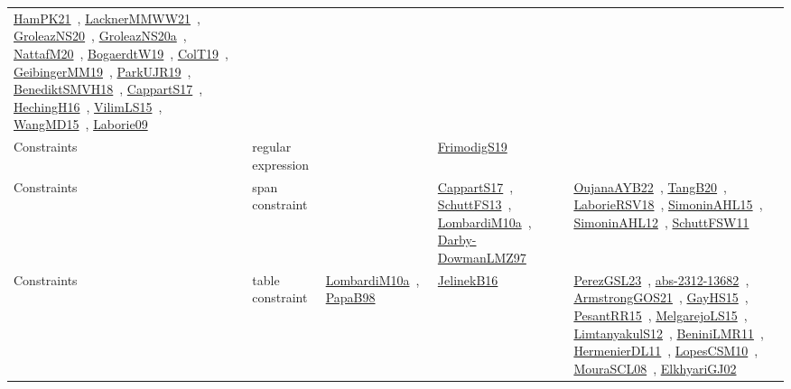 {\begin{longtable}{lp{3cm}>{\raggedright\arraybackslash}p{6cm}>{\raggedright\arraybackslash}p{6cm}>{\raggedright\arraybackslash}p{8cm}}
\href{articles/HamPK21.pdf}{HamPK21}~\cite{HamPK21}, \href{papers/LacknerMMWW21.pdf}{LacknerMMWW21}~\cite{LacknerMMWW21}, \href{papers/GroleazNS20.pdf}{GroleazNS20}~\cite{GroleazNS20}, \href{papers/GroleazNS20a.pdf}{GroleazNS20a}~\cite{GroleazNS20a}, \href{papers/NattafM20.pdf}{NattafM20}~\cite{NattafM20}, \href{papers/BogaerdtW19.pdf}{BogaerdtW19}~\cite{BogaerdtW19}, \href{papers/ColT19.pdf}{ColT19}~\cite{ColT19}, \href{papers/GeibingerMM19.pdf}{GeibingerMM19}~\cite{GeibingerMM19}, \href{papers/ParkUJR19.pdf}{ParkUJR19}~\cite{ParkUJR19}, \href{papers/BenediktSMVH18.pdf}{BenediktSMVH18}~\cite{BenediktSMVH18}, \href{papers/CappartS17.pdf}{CappartS17}~\cite{CappartS17}, \href{papers/HechingH16.pdf}{HechingH16}~\cite{HechingH16}, \href{papers/VilimLS15.pdf}{VilimLS15}~\cite{VilimLS15}, \href{articles/WangMD15.pdf}{WangMD15}~\cite{WangMD15}, \href{papers/Laborie09.pdf}{Laborie09}~\cite{Laborie09}\\
Constraints & regular expression &  & \href{papers/FrimodigS19.pdf}{FrimodigS19}~\cite{FrimodigS19} & \\
Constraints & span constraint &  & \href{papers/CappartS17.pdf}{CappartS17}~\cite{CappartS17}, \href{papers/SchuttFS13.pdf}{SchuttFS13}~\cite{SchuttFS13}, \href{articles/LombardiM10a.pdf}{LombardiM10a}~\cite{LombardiM10a}, \href{articles/Darby-DowmanLMZ97.pdf}{Darby-DowmanLMZ97}~\cite{Darby-DowmanLMZ97} & \href{papers/OujanaAYB22.pdf}{OujanaAYB22}~\cite{OujanaAYB22}, \href{papers/TangB20.pdf}{TangB20}~\cite{TangB20}, \href{articles/LaborieRSV18.pdf}{LaborieRSV18}~\cite{LaborieRSV18}, \href{articles/SimoninAHL15.pdf}{SimoninAHL15}~\cite{SimoninAHL15}, \href{papers/SimoninAHL12.pdf}{SimoninAHL12}~\cite{SimoninAHL12}, \href{articles/SchuttFSW11.pdf}{SchuttFSW11}~\cite{SchuttFSW11}\\
Constraints & table constraint & \href{articles/LombardiM10a.pdf}{LombardiM10a}~\cite{LombardiM10a}, \href{articles/PapaB98.pdf}{PapaB98}~\cite{PapaB98} & \href{papers/JelinekB16.pdf}{JelinekB16}~\cite{JelinekB16} & \href{papers/PerezGSL23.pdf}{PerezGSL23}~\cite{PerezGSL23}, \href{articles/abs-2312-13682.pdf}{abs-2312-13682}~\cite{abs-2312-13682}, \href{papers/ArmstrongGOS21.pdf}{ArmstrongGOS21}~\cite{ArmstrongGOS21}, \href{papers/GayHS15.pdf}{GayHS15}~\cite{GayHS15}, \href{papers/PesantRR15.pdf}{PesantRR15}~\cite{PesantRR15}, \href{papers/MelgarejoLS15.pdf}{MelgarejoLS15}~\cite{MelgarejoLS15}, \href{articles/LimtanyakulS12.pdf}{LimtanyakulS12}~\cite{LimtanyakulS12}, \href{articles/BeniniLMR11.pdf}{BeniniLMR11}~\cite{BeniniLMR11}, \href{papers/HermenierDL11.pdf}{HermenierDL11}~\cite{HermenierDL11}, \href{articles/LopesCSM10.pdf}{LopesCSM10}~\cite{LopesCSM10}, \href{papers/MouraSCL08.pdf}{MouraSCL08}~\cite{MouraSCL08}, \href{papers/ElkhyariGJ02.pdf}{ElkhyariGJ02}~\cite{ElkhyariGJ02}\\

\end{longtable}}
